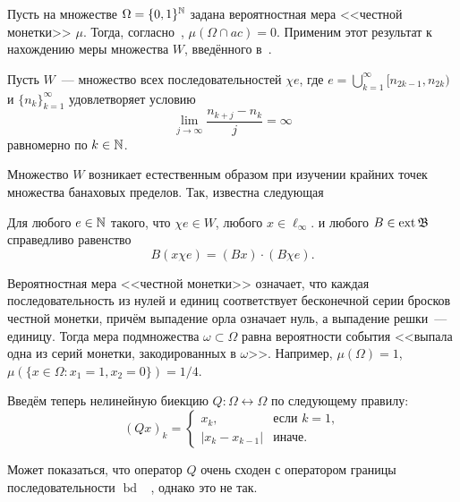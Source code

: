 Пусть на множестве $\Omega=\{0,1\}^{\mathbb{N}}$ задана вероятностная мера <<честной монетки>> $\mu$.
Тогда, согласно~\cite{connor1990almost}, $\mu(\Omega\cap ac)=0$.
Применим этот результат к нахождению меры множества $W$,
введённого в~\cite[\S 5]{Semenov2014geomprops}.

Пусть $W$~--- множество всех последовательностей $\chi e$, где $e =\bigcup_{k=1}^{\infty} [n_{2k-1}, n_{2k} )$
и $\{n_k \}_{k=1}^{\infty}$
удовлетворяет условию
\begin{equation}
	\label{eq:lim_j_n_kj_measure}
	\lim_{j\to\infty}\frac{n_{k+j} - n_k}{j} = \infty
\end{equation}
равномерно по $k \in \mathbb{N}$.

Множество $W$ возникает естественным образом при изучении крайних точек множества банаховых пределов.
Так, известна следующая
\begin{lemma}
	Для любого $e\in\mathbb{N}$ такого, что $\chi e \in W$,
	любого $x\in\ell_\infty$.
	и любого $B\in\operatorname{ext}\mathfrak{B}$
	справедливо равенство
	\begin{equation}
		B(x\chi e) = (Bx) \cdot (B\chi e)
		.
	\end{equation}
\end{lemma}


Вероятностная мера <<честной монетки>> означает,
что каждая последовательность из нулей и единиц соответствует бесконечной серии
бросков честной монетки, причём выпадение орла означает нуль, а выпадение решки~--- единицу.
Тогда мера подмножества $\omega\subset\Omega$
равна вероятности события <<выпала одна из серий монетки, закодированных в $\omega$>>.
Например, $\mu(\Omega)=1$, $\mu(\{x\in\Omega:x_1=1, x_2=0\})=1/4$.

Введём теперь нелинейную биекцию $Q:\Omega\leftrightarrow\Omega$ по следующему правилу:
\begin{equation}
	(Qx)_k = \begin{cases}
		x_k, &\mbox{если~} k = 1,
		\\
		|x_k-x_{k-1}|&\mbox{иначе}.
	\end{cases}
\end{equation}

\begin{remark}
	Может показаться, что оператор $Q$ очень сходен с оператором границы последовательности $\operatorname{bd}$
	~\cite{keller1992invariant},
	однако это не так.
\end{remark}

